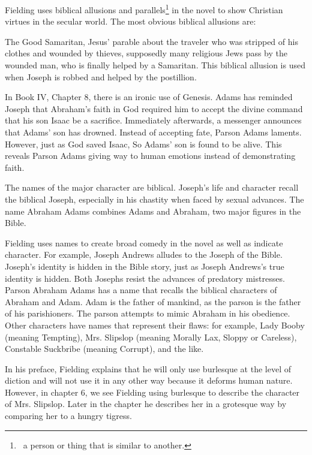 \documentclass[12pt, a4paper]{article}
\begin{document}

\ind Fielding uses biblical allusions and parallels\footnote{\, 
a person or thing that is similar to another.} in the novel
to show Christian virtues in the secular world. 
The most obvious biblical allusions are:\smallbreak

\ind The Good Samaritan, Jesus’ parable about the traveler who was 
stripped of his clothes and wounded by thieves,
supposedly many religious Jews pass by the wounded man, who
is finally helped by a
Samaritan. This biblical allusion is used when Joseph is 
robbed and helped by the postillion.\smallbreak

\ind In Book IV, Chapter 8, there is an ironic use of 
Genesis. Adams has reminded Joseph that Abraham's faith in
God required him to accept the divine command that his son Isaac
be a sacrifice. Immediately afterwards, a messenger announces that 
Adams' son has drowned. Instead of accepting fate, Parson Adams
laments. However, just as God saved Isaac, So Adams' son is found to 
be alive. This reveals Parson Adams giving way to human emotions instead
of demonstrating faith.\smallbreak

\ind The names of the major character are biblical. Joseph's life
and character recall the biblical Joseph, especially in his chastity
when faced by sexual advances. The name Abraham Adams combines
Adams and Abraham, two major figures in the Bible.\smallbreak



\ind Fielding uses names to create broad comedy in the novel as well as 
indicate character. For example, Joseph Andrews alludes to the Joseph of the Bible.
Joseph's identity is hidden in the Bible story, 
just as Joseph Andrews's true identity is hidden. Both Josephs resist the advances of predatory 
mistresses. Parson Abraham Adams has a name that recalls the biblical characters of 
Abraham and Adam. Adam is the father of mankind, as the parson is the father of his 
parishioners. The parson attempts to mimic Abraham in his obedience. Other characters have 
names that represent their flaws: for example, Lady Booby (meaning Tempting), Mrs. Slipslop 
(meaning Morally Lax, Sloppy or Careless), Constable Suckbribe (meaning Corrupt), and the 
like. 



\ind In his preface, Fielding explains that he will only use burlesque at the level 
of diction and will not use it in any other way because it deforms human nature.
However, in chapter 6, we see Fielding using burlesque to describe the character
of Mrs. Slipslop. Later in the chapter he describes her in a grotesque way by
comparing her to a hungry tigress. 
\end{document}
